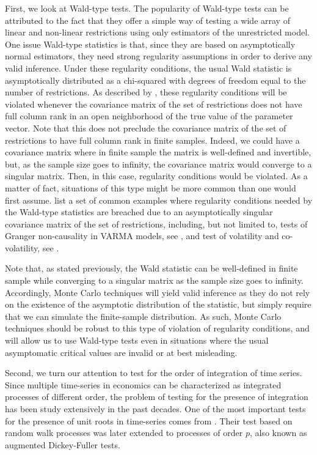 \documentclass[11pt]{article}\usepackage[]{graphicx}\usepackage[]{color}
\begin{document}
First, we look at Wald-type tests. The popularity of Wald-type tests can be attributed to the fact that they offer a simple way of testing a wide array of linear and non-linear restrictions using only estimators of the unrestricted model. One issue Wald-type statistics is that, since they are based on asymptotically normal estimators, they need strong regularity assumptions in order to derive any valid inference. Under these regularity conditions, the usual Wald statistic is asymptotically distributed as a chi-squared with degrees of freedom equal to the number of restrictions. As described by \cite{dufour_wald_2013}, these regularity conditions will be violated whenever the covariance matrix of the set of restrictions does not have full column rank in an open neighborhood of the true value of the parameter vector. Note that this does not preclude the  covariance matrix of the set of restrictions to have full column rank in finite samples. Indeed, we could have a covariance matrix where in finite sample the matrix is well-defined and invertible, but, as the sample size goes to infinity, the covariance matrix would converge to a singular matrix. Then, in this case, regularity conditions would be violated. As a matter of fact, situations of this type might be more common than one would first assume. \cite{dufour_wald_2013} list a set of common examples where regularity conditions needed by the Wald-type statistics are breached due to an asymptotically singular covariance matrix of the set of restrictions, including, but not limited to, tests of Granger non-causality in VARMA models, see \cite{boudjellaba_testing_1992, boudjellaba_simplified_1992}, and test of volatility and co-volatility, see \cite{gourieroux_size_2013}.

Note that, as stated previously, the Wald statistic can be well-defined in finite sample while converging to a singular matrix as the sample size goes to infinity. Accordingly, Monte Carlo techniques will yield valid inference as they do not rely on the existence of the asymptotic distribution of the statistic, but simply require that we can simulate the finite-sample distribution. As such, Monte Carlo techniques should be robust to this type of violation of regularity conditions, and will allow us to use Wald-type tests even in situations where the usual asymptomatic critical values are invalid or at best misleading.

Second, we turn our attention to test for the order of integration of time series. Since multiple time-series in economics can be characterized as integrated processes of different order, the problem of testing for the presence of integration has been study extensively in the past decades. One of the most important tests for the presence of unit roots in time-series comes from \cite{dickey_distribution_1979,fuller_introduction_1976}. Their test based on random walk processes was later extended to processes of order $p$, also known as augmented Dickey-Fuller tests.
\end{document}
